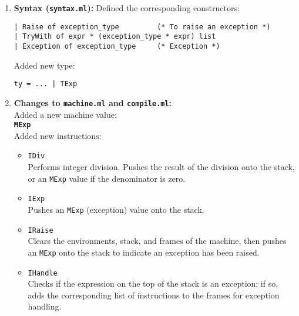 \documentclass[a4paper,12pt]{article}
\begin{document}
\begin{enumerate}[left=0.5cm]
    \item \textbf{Syntax (\texttt{syntax.ml}):}  
    Defined the corresponding constructors:
\begin{lstlisting}
| Raise of exception_type         (* To raise an exception *)
| TryWith of expr * (exception_type * expr) list
| Exception of exception_type     (* Exception *)
\end{lstlisting}
    Added new type:
\begin{lstlisting}
ty = ... | TExp
\end{lstlisting}
    \item \textbf{Changes to \texttt{machine.ml} and \texttt{compile.ml}:}\\
    Added a new machine value:\\
    \textbf{\texttt{MExp}}\\
    Added new instructions:
    \begin{itemize}[left=0.2cm]
        \item \texttt{IDiv} \\
        Performs integer division. Pushes the result of the division onto the stack, or an \texttt{MExp} value if the denominator is zero.
        \item \texttt{IExp} \\
        Pushes an \texttt{MExp} (exception) value onto the stack.
        \item \texttt{IRaise} \\
        Clears the environments, stack, and frames of the machine, then pushes an \texttt{MExp} onto the stack to indicate an exception has been raised.
        \item \texttt{IHandle} \\
        Checks if the expression on the top of the stack is an exception; if so, adds the corresponding list of instructions to the frames for exception handling.
    \end{itemize}
    \end{enumerate}
\end{document}
